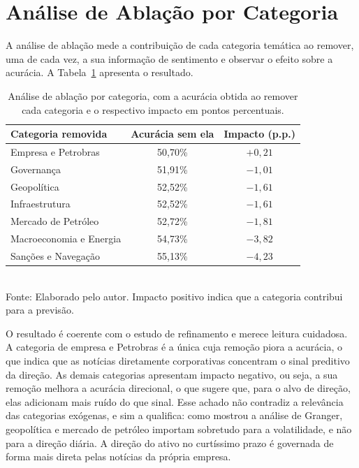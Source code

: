 \section{Análise de Ablação por Categoria}

A análise de ablação mede a contribuição de cada categoria temática ao remover, uma de cada vez, a sua informação de sentimento e observar o efeito sobre a acurácia. A Tabela~\ref{tab:ablacao} apresenta o resultado.

\begin{table}[htpb]
\centering
\caption{Análise de ablação por categoria, com a acurácia obtida ao remover cada categoria e o respectivo impacto em pontos percentuais.}
\label{tab:ablacao}
\begin{tabular}{lcc}
\hline
\textbf{Categoria removida} & \textbf{Acurácia sem ela} & \textbf{Impacto (p.p.)} \\ \hline
Empresa e Petrobras & 50,70\% & $+0{,}21$ \\
Governança & 51,91\% & $-1{,}01$ \\
Geopolítica & 52,52\% & $-1{,}61$ \\
Infraestrutura & 52,52\% & $-1{,}61$ \\
Mercado de Petróleo & 52,72\% & $-1{,}81$ \\
Macroeconomia e Energia & 54,73\% & $-3{,}82$ \\
Sanções e Navegação & 55,13\% & $-4{,}23$ \\ \hline
\end{tabular}
\vspace{0.2cm}
{\small \\ Fonte: Elaborado pelo autor. Impacto positivo indica que a categoria contribui para a previsão.}
\end{table}

O resultado é coerente com o estudo de refinamento e merece leitura cuidadosa. A categoria de empresa e Petrobras é a única cuja remoção piora a acurácia, o que indica que as notícias diretamente corporativas concentram o sinal preditivo da direção. As demais categorias apresentam impacto negativo, ou seja, a sua remoção melhora a acurácia direcional, o que sugere que, para o alvo de direção, elas adicionam mais ruído do que sinal. Esse achado não contradiz a relevância das categorias exógenas, e sim a qualifica: como mostrou a análise de Granger, geopolítica e mercado de petróleo importam sobretudo para a volatilidade, e não para a direção diária. A direção do ativo no curtíssimo prazo é governada de forma mais direta pelas notícias da própria empresa.

